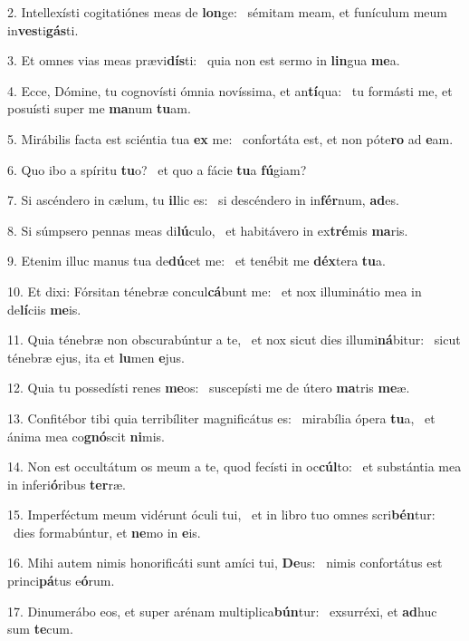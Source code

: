 2. Intellexísti cogitatiónes meas de \textbf{lon}ge: \ast\  sémitam meam, et funículum meum in\textbf{ves}ti\textbf{gás}ti.\

3. Et omnes vias meas prævi\textbf{dís}ti: \ast\  quia non est sermo in \textbf{lin}gua \textbf{me}a.\

4. Ecce, Dómine, tu cognovísti ómnia novíssima, et an\textbf{tí}qua: \ast\  tu formásti me, et posuísti super me \textbf{ma}num \textbf{tu}am.\

5. Mirábilis facta est sciéntia tua \textbf{ex} me: \ast\  confortáta est, et non póte\textbf{ro} ad \textbf{e}am.\

6. Quo ibo a spíritu \textbf{tu}o? \ast\  et quo a fácie \textbf{tu}a \textbf{fú}giam?\

7. Si ascéndero in cælum, tu \textbf{il}lic es: \ast\  si descéndero in in\textbf{fér}num, \textbf{ad}es.\

8. Si súmpsero pennas meas di\textbf{lú}culo, \ast\  et habitávero in ex\textbf{tré}mis \textbf{ma}ris.\

9. Etenim illuc manus tua de\textbf{dú}cet me: \ast\  et tenébit me \textbf{déx}tera \textbf{tu}a.\

10. Et dixi: Fórsitan ténebræ concul\textbf{cá}bunt me: \ast\  et nox illuminátio mea in de\textbf{lí}ciis \textbf{me}is.\

11. Quia ténebræ non obscurabúntur a te, \dag\  et nox sicut dies illumi\textbf{ná}bitur: \ast\  sicut ténebræ ejus, ita et \textbf{lu}men \textbf{e}jus.\

12. Quia tu possedísti renes \textbf{me}os: \ast\  suscepísti me de útero \textbf{ma}tris \textbf{me}æ.\

13. Confitébor tibi quia terribíliter magnificátus es: \dag\  mirabília ópera \textbf{tu}a, \ast\  et ánima mea co\textbf{gnó}scit \textbf{ni}mis.\

14. Non est occultátum os meum a te, quod fecísti in oc\textbf{cúl}to: \ast\  et substántia mea in inferi\textbf{ó}ribus \textbf{ter}ræ.\

15. Imperféctum meum vidérunt óculi tui, \dag\  et in libro tuo omnes scri\textbf{bén}tur: \ast\  dies formabúntur, et \textbf{ne}mo in \textbf{e}is.\

16. Mihi autem nimis honorificáti sunt amíci tui, \textbf{De}us: \ast\  nimis confortátus est princi\textbf{pá}tus e\textbf{ó}rum.\

17. Dinumerábo eos, et super arénam multiplica\textbf{bún}tur: \ast\  exsurréxi, et \textbf{ad}huc sum \textbf{te}cum.\


